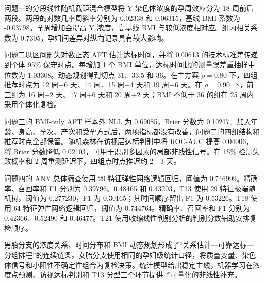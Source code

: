 \documentclass[UTF8,fontset=fandol,zihao=-4,a4paper]{ctexart}
\begin{document}
问题一的分段线性随机截距混合模型将 Y 染色体浓度的孕周效应分为 18
周前后两段。两段的对数几率周斜率分别为 0.02338 和 0.06315，基线 BMI
系数为 -0.03798。孕周增加会提高 Y 浓度，高基线 BMI
与较低浓度相对应。组内相关系数为
0.7305，孕妇间差异对纵向记录具有较大影响。

问题二以区间删失对数正态 AFT 估计达标时间，并将 0.00613
的技术标准差传递到个体 95\% 保守时点。每增加 1 个 BMI
单位，达标时间比的测量误差重抽样中位数为 1.03308。动态规划得到切点
31、33.5 和 36。在主方案 \(\rho=0.80\) 下，四组推荐时点为 12 周+6 天、14
周、15 周+4 天和 19 周+6 天。在 \(\rho=0.90\) 下，前三组为 16 周+2
天、17 周+6 天和 20 周+2 天；BMI 不低于 36 的组在 25
周内采用个体化复检。

问题三的 BMI-only AFT 样本外 NLL 为 0.69085，Brier 分数为
0.10217。加入年龄、身高、孕次、产次和受孕方式后，两项指标都没有改善，问题二的四组结构和推荐时点全部保留。随机森林在访视层达标判别中将
ROC-AUC 提高 0.04006，将 Brier 分数降低
0.02103，可用于识别多因素的局部非线性信号。在 15\% 检测失败概率和 2
周重测延迟下，四组点时点推迟约 2---3 天。

问题四的 ANY 总体筛查使用 29 特征弹性网络逻辑回归，阈值为
0.746999。精确率、召回率和 F1 分别为 0.39796、0.48465 和 0.43203。T13
使用 29 特征极端随机树，阈值为 0.277230，F1 为 0.30165；其时间顺序留出
F1 为 0.53226。T18 使用 64 特征弹性网络逻辑回归，阈值为
0.744764。精确率、召回率和 F1 分别为 0.42366、0.52490 和 0.46477。T21
使用收缩线性判别分析的判别分数辅助安排复检顺序。

\enlargethispage{2\baselineskip}

男胎分支的浓度关系、时间分布和 BMI
动态规划形成了``关系估计---可靠达标---分组排程''的连续链条。女胎分支使用相同的孕妇级统计口径，将质量变量、染色体信号和小阳性不确定性组合为复检决策。统计模型给出稳定主线，机器学习在浓度点预测、访视达标判别和
T13 分型三个环节提供了可量化的非线性补充。
\end{document}
